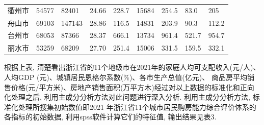 \documentclass[a4paper, 12pt, twoside]{ctexart}
\begin{document}
\begin{spacing}{1}
\begin{table}[H]
\begin{tabular}{*{9}{@{}m{3.5\ccwd}<{\centering}}}
        衢州市 &	54577 &	82401 &	24.66	 &    228.7 &	15684 & 	254.5 &	83.0  &	205\\
        舟山市 &	69103 &	147143	 &28.86 &	116.5 &	14831 & 	203.9 &	90.3 &	112.2\\
        台州市 &	68053 &	87366 &	28.37 &	666.1 &	13734  &	961.4 &	521.7 &	954.7\\
        丽水市 &	53259 &	68209 &	27.70 &	251.4 &	15006  &	331.5 &	159.5	 &332.1\\
        \bottomrule
    \end{tabular}
\end{table}\vspace*{-5pt}
\end{spacing}
根据上表, 清楚看出浙江省的11个地级市在2021年的家庭人均可支配收入(元/人)、人均GDP (元)、城镇居民恩格尔系数(\%)、各市生产总值(亿元)、 商品房平均销售价格(元/平方米)、房地产销售面积(万平方木)经过对以上数据的标准化和正向化处理之后, 利用主成分分析方法对此问题进行深入分析.  利用主成分分析方法, 标准化处理所搜集初始数值即2021 年浙江省11个城市居民购房能力综合评价体系的各指标的初始数据, 利用spss软件计算它们的特征值, 输出结果见表3.
\end{document}

